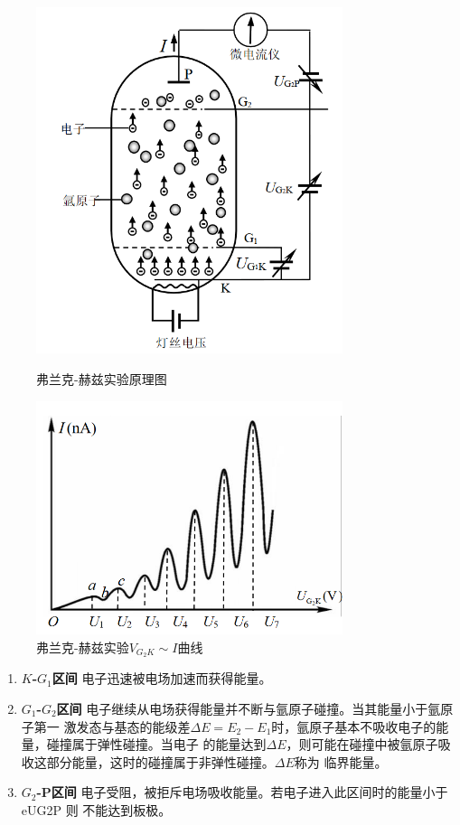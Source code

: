 \documentclass[a4paper,UTF8]{ctexart}
\begin{document}
\begin{figure}[H]
    \centering
    \begin{minipage}[b]{0.45\textwidth}
        \centering
        \includegraphics[width=0.8\textwidth]{./fh_app.png}
        \caption{弗兰克-赫兹实验原理图}
    \end{minipage}
    \begin{minipage}[b]{0.45\textwidth}
        \centering
        \includegraphics[width=0.8\textwidth]{./fh_fig.png}
        \caption{弗兰克-赫兹实验$V_{G_{2}K} \sim I$曲线}
    \end{minipage}
\end{figure}

\begin{enumerate}
    \item {\bfseries{$K$-$G_{1}$区间}} 电子迅速被电场加速而获得能量。
    \item {\bfseries{$G_{1}$-$G_{2}$区间}} 电子继续从电场获得能量并不断与氩原子碰撞。当其能量小于氩原子第一
激发态与基态的能级差$\Delta E = E_{2}-E_{1}$时，氩原子基本不吸收电子的能量，碰撞属于弹性碰撞。当电子
的能量达到$\Delta E$，则可能在碰撞中被氩原子吸收这部分能量，这时的碰撞属于非弹性碰撞。$\Delta E$称为
临界能量。
    \item {\bfseries{$G_{2}$-P区间}} 电子受阻，被拒斥电场吸收能量。若电子进入此区间时的能量小于 eUG2P 则
不能达到板极。
\end{enumerate}
\end{document}
